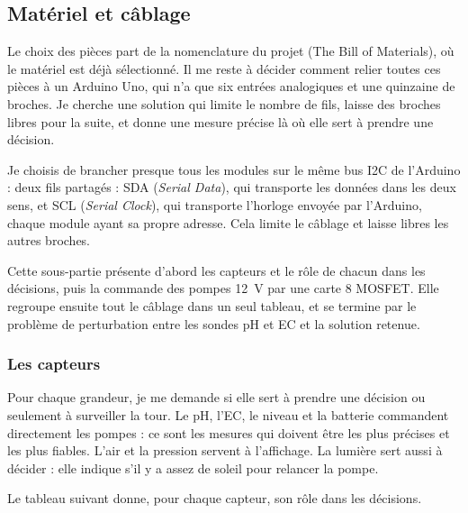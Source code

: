 \subsection{Matériel et câblage}

Le choix des pièces part de la nomenclature du projet (The Bill of Materials), où le matériel est déjà sélectionné. Il me reste à décider comment relier toutes ces pièces à un Arduino Uno, qui n'a que six entrées analogiques et une quinzaine de broches. Je cherche une solution qui limite le nombre de fils, laisse des broches libres pour la suite, et donne une mesure précise là où elle sert à prendre une décision.

Je choisis de brancher presque tous les modules sur le même bus I2C de l'Arduino : deux fils partagés : SDA (\emph{Serial Data}), qui transporte les données dans les deux sens, et SCL (\emph{Serial Clock}), qui transporte l'horloge envoyée par l'Arduino, chaque module ayant sa propre adresse. Cela limite le câblage et laisse libres les autres broches.

Cette sous-partie présente d'abord les capteurs et le rôle de chacun dans les décisions, puis la commande des pompes \qty{12}{V} par une carte 8 MOSFET. Elle regroupe ensuite tout le câblage dans un seul tableau, et se termine par le problème de perturbation entre les sondes pH et EC et la solution retenue.

\subsubsection*{Les capteurs}

Pour chaque grandeur, je me demande si elle sert à prendre une décision ou seulement à surveiller la tour. Le pH, l'EC, le niveau et la batterie commandent directement les pompes : ce sont les mesures qui doivent être les plus précises et les plus fiables. L'air et la pression servent à l'affichage. La lumière sert aussi à décider : elle indique s'il y a assez de soleil pour relancer la pompe.

Le tableau suivant donne, pour chaque capteur, son rôle dans les décisions.

